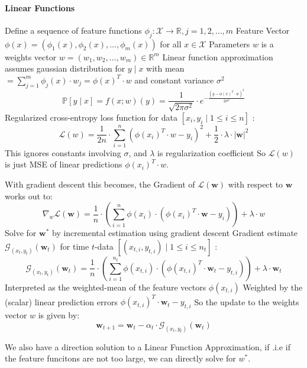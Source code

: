 \documentclass[11pt]{article}
\begin{document}
\paragraph*{Linear Functions}
Define a sequence of feature functions $\phi_j: \mathcal{X} \rightarrow \mathbb{R}, j=1,2, \ldots, m$ Feature Vector $\phi(x)=\left(\phi_1(x), \phi_2(x), \ldots, \phi_m(x)\right)$ for all $x \in \mathcal{X}$
Parameters $w$ is a weights vector $w=\left(w_1, w_2, \ldots, w_m\right) \in \mathbb{R}^m$
Linear function approximation assumes gaussian distribution for $y \mid x$
with mean $=\sum_{j=1}^m \phi_j(x) \cdot w_j=\phi(x)^T \cdot w$ and constant variance $\sigma^2$
$$
\mathbb{P}[y \mid x]=f(x ; w)(y)=\frac{1}{\sqrt{2 \pi \sigma^2}} \cdot e^{-\frac{\left(y-\phi(x)^T \cdot w\right)^2}{2 \sigma^2}}
$$
Regularized cross-entropy loss function for data $\left[x_i, y_i \mid 1 \leq i \leq n\right]$ :
$$
\mathcal{L}(w)=\frac{1}{2 n} \cdot \sum_{i=1}^n\left(\phi\left(x_i\right)^T \cdot w-y_i\right)^2+\frac{1}{2} \cdot \lambda \cdot|\boldsymbol{w}|^2
$$
This ignores constants involving $\sigma$, and $\lambda$ is regularization coefficient So $\mathcal{L}(w)$ is just MSE of linear predictions $\phi\left(x_i\right)^T \cdot w$.

With gradient descent this becomes, the Gradient of $\mathcal{L}(\boldsymbol{w})$ with respect to $\boldsymbol{w}$ works out to:
$$
\nabla_w \mathcal{L}(\boldsymbol{w})=\frac{1}{n} \cdot\left(\sum_{i=1}^n \phi\left(x_i\right) \cdot\left(\phi\left(x_i\right)^T \cdot \boldsymbol{w}-y_i\right)\right)+\lambda \cdot w
$$
Solve for $\boldsymbol{w}^*$ by incremental estimation using gradient descent Gradient estimate $\mathcal{G}_{\left(x_t, y_t\right)}\left(\boldsymbol{w}_t\right)$ for time $t$-data $\left[\left(x_{t, i}, y_{t, i}\right) \mid 1 \leq i \leq n_t\right]$ :
$$
\mathcal{G}_{\left(x_t, y_t\right)}\left(\boldsymbol{w}_t\right)=\frac{1}{n} \cdot\left(\sum_{i=1}^{n_t} \phi\left(x_{t, i}\right) \cdot\left(\phi\left(x_{t, i}\right)^T \cdot \boldsymbol{w}_t-y_{t, i}\right)\right)+\lambda \cdot \boldsymbol{w}_t
$$
Interpreted as the weighted-mean of the feature vectors $\phi\left(x_{t, i}\right)$ Weighted by the (scalar) linear prediction errors $\phi\left(x_{t, i}\right)^T \cdot \boldsymbol{w}_t-y_{t, i}$ So the update to the weights vector $w$ is given by:
$$
\boldsymbol{w}_{t+1}=\boldsymbol{w}_t-\alpha_t \cdot \mathcal{G}_{\left(x_t, y_t\right)}\left(\boldsymbol{w}_t\right)
$$

We also have a direction solution to a Linear Function Approximation, if .i.e if the feature funcitons are not too large, we can directly solve for $w^*$. 
\end{document}
